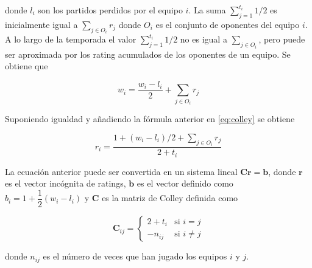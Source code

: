 donde $l_i$ son los partidos perdidos por el equipo $i$. La suma $\sum_{j=1}^{t_i} 1/2 $ es inicialmente igual a $\sum_{j \in O_i} r_j$ donde $O_i$ es el conjunto de oponentes del equipo $i$. A lo largo de la temporada el valor $\sum_{j=1}^{t_i} 1/2 $ no es igual a $\sum_{j \in O_i}$, pero puede ser aproximada por los rating acumulados de los oponentes de un equipo. Se obtiene que

\begin{equation}
w_i = \dfrac{w_i - l_i}{2} + \sum_{j \in O_i} r_j
\end{equation}  

Suponiendo igualdad y añadiendo la fórmula anterior en \ref{eq:colley} se obtiene

\begin{equation}
r_i = \dfrac{1+ (w_i - l_i)/2 + \sum_{j \in O_i} r_j }{2 + t_i}
\end{equation}

La ecuación anterior puede ser convertida en un sistema lineal $\mathbf{C r} = \mathbf{b}$, donde $\mathbf{r}$ es el vector incógnita de ratings, $\mathbf{b}$ es el vector definido como $b_i = 1 + \dfrac{1}{2}(w_i - l_i)$ y $\mathbf{C}$ es la matriz de Colley definida como

\begin{equation}\label{eq:colley_matriz}
\mathbf{C}_{ij} = \begin{cases}
2 + t_i & \text{si } i = j\\
-n_{ij} & \text{si } i \neq j
\end{cases}
\end{equation}

donde $n_{ij}$ es el número de veces que han jugado los equipos $i$ y $j$.

